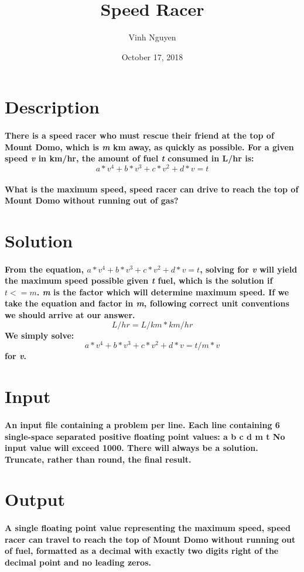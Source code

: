 \documentclass[12pt, oneside, a4paper]{article}
\begin{document}
\title{Speed Racer}
\author{Vinh Nguyen}
\date{October 17, 2018}
\maketitle
\newpage

\section*{Description}
	\paragraph{
		There is a speed racer who must rescue their friend at the top of Mount Domo,
		which is \emph{m} km away, as quickly as possible.  For a given speed 
		\emph{v} in km/hr, the amount of fuel \emph{t} consumed in L/hr is: 
		$$a*v^4 + b*v^3 + c*v^2 + d*v = t$$
	}
	\paragraph{
		What is the maximum speed, speed racer can drive to reach the top of Mount
		Domo without running out of gas?
	}
	
\section*{Solution}
	\paragraph{
		From the equation, $a*v^4 + b*v^3 + c*v^2 + d*v = t$, solving for \emph{v}
		will yield the maximum speed possible given \emph{t} fuel, which is the
		solution if $t <= m$.
		\hspace{0pt}
		\emph{m} is the factor which will determine maximum speed.  If we take the
		equation and factor in \emph{m}, following correct unit conventions we should
		arrive at our answer.
		$$L/hr = L/km * km/hr$$
		We simply solve: $$a*v^4 + b*v^3 + c*v^2 + d*v = t/m * v$$
		for \emph{v}.
	}

\section*{Input}
	\paragraph{
		An input file containing a problem per line.\hspace{0pt}
		Each line containing 6 single-space separated positive floating point values:
		a b c d m t
		No input value will exceed 1000.  
		There will always be a solution.
		Truncate, rather than round, the final result.
	}	

\section*{Output}
	\paragraph{
		A single floating point value representing the maximum speed, speed racer can
		travel to reach the top of Mount Domo without running out of fuel, formatted
		as a decimal with exactly two digits right of the decimal point and no leading
		zeros.
	}
	
\end{document}
